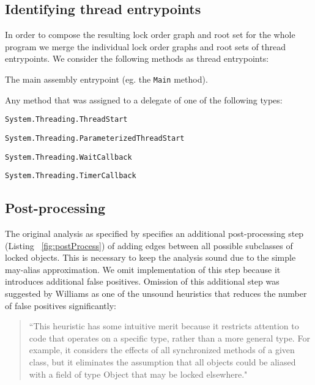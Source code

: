 \subsection{Identifying thread entrypoints}

In order to compose the resulting lock order graph and root set for the whole program we merge the individual lock order graphs and root sets of thread entrypoints. We consider the following methods as thread entrypoints:
\begin{itemize*}
\item The main assembly entrypoint (eg. the \texttt{Main} method).
\item Any method that was assigned to a delegate of one of the following types:
\begin{itemize*}
\item \texttt{System.Threading.ThreadStart}
\item \texttt{System.Threading.ParameterizedThreadStart}
\item \texttt{System.Threading.WaitCallback}
\item \texttt{System.Threading.TimerCallback}
\end{itemize*}
\end{itemize*}

\subsection{Post-processing}

The original analysis as specified by \citet{Williams2005} specifies an additional post-processing step (Listing ~\ref{fig:postProcess}) of adding edges between all possible subclasses of locked objects. This is necessary to keep the analysis sound due to the simple may-alias approximation. We omit implementation of this step because it introduces additional false positives. Omission of this additional step was suggested by Williams as one of the unsound heuristics that reduces the number of false positives significantly:

\begin{quote}
``This heuristic has some intuitive merit because it restricts attention to code that operates on a specific type, rather than a more general type. For example, it considers the effects of all synchronized methods of a given class, but it eliminates the assumption that all objects could be aliased with a field of type Object that may be locked elsewhere."
\end{quote}

